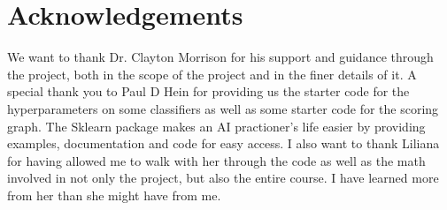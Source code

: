 \documentclass[10pt]{article}
\begin{document}
\section{Acknowledgements}
We want to thank Dr. Clayton Morrison for his support and guidance through the project, both in the scope of the project and in the finer details of it. A special thank you to Paul D Hein for providing us the starter code for the hyperparameters on some classifiers as well as some starter code for the scoring graph. The Sklearn package makes an AI practioner's life easier by providing examples, documentation and code for easy access. I also want to thank Liliana for having allowed me to walk with her through the code as well as the math involved in not only the project, but also the entire course. I have learned more from her than she might have from me.
\end{document}
